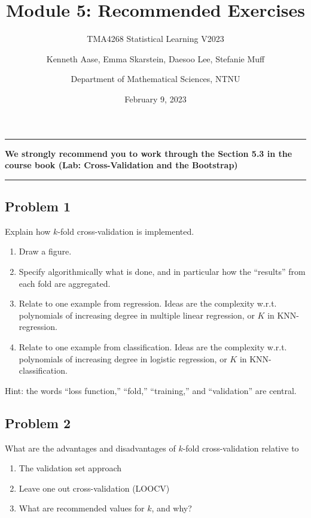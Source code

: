 \documentclass[
]{article}
\title{Module 5: Recommended Exercises}
\subtitle{TMA4268 Statistical Learning V2023}
\author{Kenneth Aase, Emma Skarstein, Daesoo Lee, Stefanie
Muff \and Department of Mathematical Sciences, NTNU}
\date{February 9, 2023}
\providecommand{\tightlist}{%
  \setlength{\itemsep}{0pt}\setlength{\parskip}{0pt}}
\begin{document}
\maketitle

\begin{center}\rule{0.5\linewidth}{0.5pt}\end{center}

\textbf{We strongly recommend you to work through the Section 5.3 in the
course book (Lab: Cross-Validation and the Bootstrap)}

\begin{center}\rule{0.5\linewidth}{0.5pt}\end{center}

\hypertarget{problem-1}{%
\subsection{Problem 1}\label{problem-1}}

Explain how \(k\)-fold cross-validation is implemented.

\begin{enumerate}
\def\labelenumi{\alph{enumi})}
\item
  Draw a figure.
\item
  Specify algorithmically what is done, and in particular how the
  ``results'' from each fold are aggregated.
\item
  Relate to one example from regression. Ideas are the complexity w.r.t.
  polynomials of increasing degree in multiple linear regression, or
  \(K\) in KNN-regression.
\item
  Relate to one example from classification. Ideas are the complexity
  w.r.t. polynomials of increasing degree in logistic regression, or
  \(K\) in KNN-classification.
\end{enumerate}

Hint: the words ``loss function,'' ``fold,'' ``training,'' and
``validation'' are central.

\hypertarget{problem-2}{%
\subsection{Problem 2}\label{problem-2}}

What are the advantages and disadvantages of \(k\)-fold cross-validation
relative to

\begin{enumerate}
\def\labelenumi{\alph{enumi})}
\tightlist
\item
  The validation set approach
\item
  Leave one out cross-validation (LOOCV)
\item
  What are recommended values for \(k\), and why?
\end{enumerate}
\end{document}
